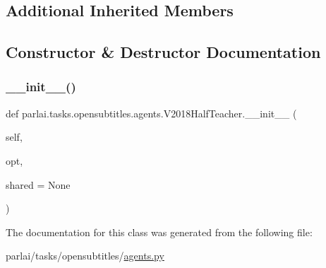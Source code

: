 \subsection*{Additional Inherited Members}


\subsection{Constructor \& Destructor Documentation}
\mbox{\label{classparlai_1_1tasks_1_1opensubtitles_1_1agents_1_1V2018HalfTeacher_ac42e92db06e46aa2a9fef8883bb17117}} 
\subsubsection{\texorpdfstring{\+\_\+\+\_\+init\+\_\+\+\_\+()}{\_\_init\_\_()}}
{\footnotesize\ttfamily def parlai.\+tasks.\+opensubtitles.\+agents.\+V2018\+Half\+Teacher.\+\_\+\+\_\+init\+\_\+\+\_\+ (\begin{DoxyParamCaption}\item[{}]{self,  }\item[{}]{opt,  }\item[{}]{shared = {\ttfamily None} }\end{DoxyParamCaption})}



The documentation for this class was generated from the following file\+:\begin{DoxyCompactItemize}
\item 
parlai/tasks/opensubtitles/\hyperlink{parlai_2tasks_2opensubtitles_2agents_8py}{agents.\+py}\end{DoxyCompactItemize}
